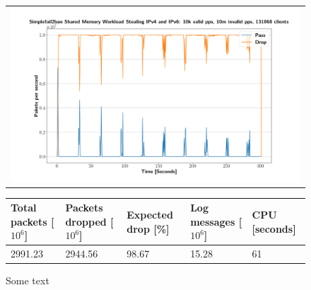 \begin{figure}[p]
	\label{fig:simplefail2ban:shm:ws}
	\centering
	\scriptsize
	\begin{tabular}{c}
    	\centerline{\includegraphics[width=1.2\textwidth]{images/simplefail2ban_shm_ws_ipv46_v10k_iv10m_c131068.png}}
	\end{tabular}
	\begin{tabular}{lllll}
		\toprule
		\textbf{Total packets [$10^6$]} & \textbf{Packets dropped [$10^6$]} & \textbf{Expected drop [\%]} & \textbf{Log messages [$10^6$]} & \textbf{CPU [seconds]} \\ \midrule 
		2991.23 & 2944.56 & 98.67 & 15.28 & 61 \\
		\bottomrule
	\end{tabular}
	\caption[Simplefail2ban Shared Memory with Workload Sharing]{Some text}
\end{figure}

